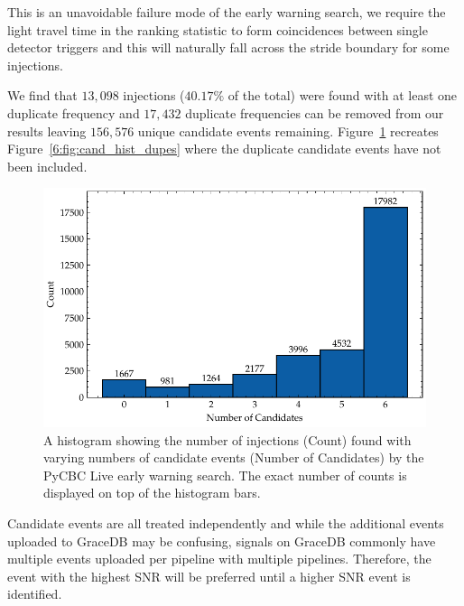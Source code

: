 This is an unavoidable failure mode of the early warning search, we require the light travel time in the ranking statistic to form coincidences between single detector triggers and this will naturally fall across the stride boundary for some injections. 



We find that $13,098$ injections ($40.17\%$ of the total) were found with at least one duplicate frequency and $17,432$ duplicate frequencies can be removed from our results leaving $156,576$ unique candidate events remaining. Figure~\ref{6:fig:cand_hist_dupes_removed} recreates Figure~\ref{6:fig:cand_hist_dupes} where the duplicate candidate events have not been included.
%
\begin{figure}
    \centering
    \includegraphics[width=1.0\textwidth]{images/6_earlywarning/results/count_histogram_dupes_removed.pdf}
    \caption{A histogram showing the number of injections (Count) found with varying numbers of candidate events (Number of Candidates) by the PyCBC Live early warning search. The exact number of counts is displayed on top of the histogram bars.}
    \label{6:fig:cand_hist_dupes_removed}
\end{figure}
%

Candidate events are all treated independently and while the additional events uploaded to GraceDB may be confusing, \gwadj signals on GraceDB commonly have multiple events uploaded per pipeline with multiple pipelines. Therefore, the event with the highest SNR will be preferred until a higher SNR event is identified. 

